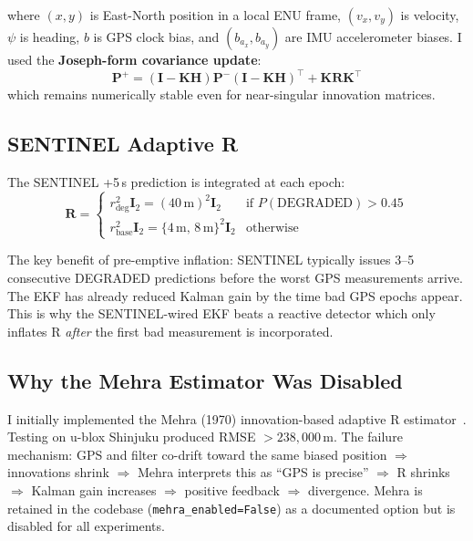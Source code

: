 \documentclass[12pt,a4paper]{article}
\begin{document}
where $(x, y)$ is East-North position in a local ENU frame, $(v_x, v_y)$ is velocity,
$\psi$ is heading, $b$ is GPS clock bias, and $(b_{a_x}, b_{a_y})$ are IMU accelerometer
biases.
I used the \textbf{Joseph-form covariance update}:
\begin{equation}
  \mathbf{P}^+ = (\mathbf{I} - \mathbf{K}\mathbf{H})\mathbf{P}^-(\mathbf{I} -
  \mathbf{K}\mathbf{H})^\top + \mathbf{K}\mathbf{R}\mathbf{K}^\top
\end{equation}
which remains numerically stable even for near-singular innovation matrices.

\subsection{SENTINEL Adaptive R}

The SENTINEL +5\,s prediction is integrated at each epoch:
\begin{equation}
  \mathbf{R} = \begin{cases}
    r_\mathrm{deg}^2 \mathbf{I}_2 = (40\,\mathrm{m})^2 \mathbf{I}_2
    & \text{if } P(\text{DEGRADED}) > 0.45 \\
    r_\mathrm{base}^2 \mathbf{I}_2 = \{4\,\mathrm{m},\, 8\,\mathrm{m}\}^2 \mathbf{I}_2
    & \text{otherwise}
  \end{cases}
\end{equation}

The key benefit of pre-emptive inflation: SENTINEL typically issues 3--5 consecutive
DEGRADED predictions before the worst GPS measurements arrive.
The EKF has already reduced Kalman gain by the time bad GPS epochs appear.
This is why the SENTINEL-wired EKF beats a reactive detector which only inflates
R \emph{after} the first bad measurement is incorporated.

\subsection{Why the Mehra Estimator Was Disabled}

I initially implemented the Mehra (1970) innovation-based adaptive R estimator~\cite{mehra1970}.
Testing on u-blox Shinjuku produced RMSE $> 238{,}000$\,m.
The failure mechanism: GPS and filter co-drift toward the same biased position
$\Rightarrow$ innovations shrink $\Rightarrow$ Mehra interprets this as ``GPS is precise''
$\Rightarrow$ R shrinks $\Rightarrow$ Kalman gain increases $\Rightarrow$ positive feedback
$\Rightarrow$ divergence.
Mehra is retained in the codebase (\texttt{mehra\_enabled=False}) as a documented option
but is disabled for all experiments.
\end{document}
